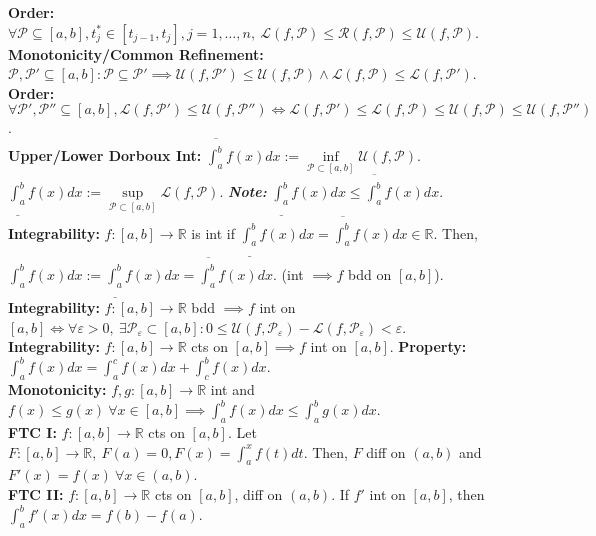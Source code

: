\documentclass{letter}
\begin{document}
{\textbf{Order:} $\forall \mathcal{P} \subseteq [a, b], t_j^* \in [t_{j
  - 1}, t_j], j = 1, \ldots, n, \ \mathcal{L}(f, \mathcal{P}) \leq
\mathcal{R}(f, \mathcal{P}) \leq \mathcal{U}(f, \mathcal{P})$. \\
\textbf{Monotonicity/Common Refinement:} $\mathcal{P}, \mathcal{P}' \subseteq [a, b] :
\mathcal{P} \subseteq \mathcal{P}' \implies \mathcal{U}(f,
\mathcal{P}') \leq \mathcal{U}(f, \mathcal{P}) \land \mathcal{L}(f,
\mathcal{P}) \leq \mathcal{L}(f, \mathcal{P}')$. \\
\textbf{Order:} $\forall \mathcal{P}', \mathcal{P}'' \subseteq[a, b],
\mathcal{L}(f, \mathcal{P}') \leq \mathcal{U}(f, \mathcal{P}'') \iff
\mathcal{L}(f, \mathcal{P}') \leq \mathcal{L}(f, \mathcal{P}) \leq
\mathcal{U}(f, \mathcal{P}) \leq \mathcal{U}(f, \mathcal{P}'')$. \\
\textbf{Upper/Lower Dorboux Int:} $\overline{\int_{a}^{b}} f(x)dx :=
\inf\limits_{\mathcal{P} \subset [a, b]} \mathcal{U}(f,
\mathcal{P})$. $\underline{\int_{a}^{b}} f(x)dx :=
\sup\limits_{\mathcal{P} \subset [a, b]} \mathcal{L}(f,
\mathcal{P})$. \textit{\textbf{Note:}} $\underline{\int_{a}^{b}}
f(x)dx \leq \overline{\int_{a}^{b}} f(x)dx$. \\
\textbf{Integrability:} $f : [a, b] \to \mathbb{R}$ is int if
$\underline{\int_{a}^{b}} f(x)dx = \overline{\int_{a}^{b}} f(x)dx \in
\mathbb{R}$. Then, $\int_{a}^{b} f(x)dx := \underline{\int_{a}^{b}}
f(x)dx = \overline{\int_{a}^{b}} f(x)dx$. (int $\implies f$ bdd on $[a,
b]$). \\
\textbf{Integrability:} $f : [a, b] \to \mathbb{R}$ bdd $\implies f$
int on $[a, b] \iff \forall \varepsilon > 0, \ \exists
\mathcal{P}_{\varepsilon} \subset [a, b] : 0 \leq \mathcal{U}(f,
\mathcal{P}_{\varepsilon}) - \mathcal{L}(f, \mathcal{P}_{\varepsilon}) <
\varepsilon$. \\
\textbf{Integrability:} $f : [a, b] \to \mathbb{R}$ cts on $[a, b]
\implies f$ int on $[a, b]$. \textbf{Property:} $\int_{a}^{b} f(x)dx =
\int_{a}^{c} f(x)dx + \int_{c}^{b} f(x)dx$. \\
\textbf{Monotonicity:} $f, g : [a, b] \to \mathbb{R}$ int and $f(x)
\leq g(x) \ \forall x \in [a, b] \implies \int_{a}^{b} f(x)dx \leq
\int_{a}^{b} g(x)dx$. \\
\textbf{FTC I:} $f : [a, b] \to \mathbb{R}$ cts on $[a, b]$. Let $F :
[a, b] \to \mathbb{R}, \ F(a) = 0, F(x) = \int_{a}^{x} f(t)dt$. Then,
$F$ diff on $(a, b)$ and $F'(x) = f(x) \ \forall x \in (a, b)$. \\
\textbf{FTC II:} $f : [a, b] \to \mathbb{R}$ cts on $[a, b]$, diff on
$(a, b)$. If $f'$ int on $[a, b]$, then $\int_{a}^{b} f'(x)dx = f(b) -
f(a)$.
} \\ \\
\end{document}
